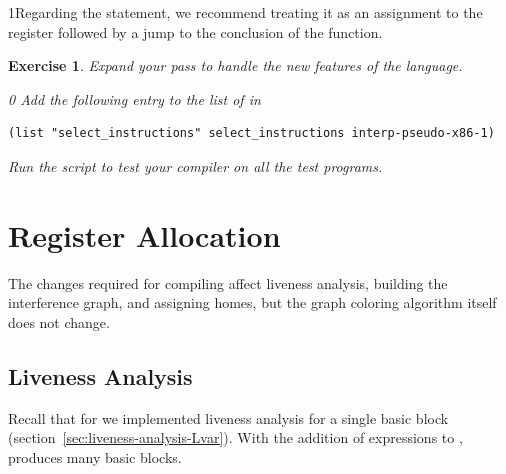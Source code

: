\documentclass[7x10]{TimesAPriori_MIT}%
\def\racketEd{0}
\def\pythonEd{1}
\def\edition{1}
\newcommand{\pythonColor}[0]{}
\newcommand{\python}[1]{{\if\edition\pythonEd\pythonColor #1\fi}}
\newtheorem{exercise}[theorem]{Exercise}
\numberwithin{theorem}{chapter}
\numberwithin{definition}{chapter}
\numberwithin{equation}{chapter}
\begin{document}
\python{Regarding the  statement, we recommend treating it
  as an assignment to the \key{rax} register followed by a jump to the
  conclusion of the \code{main} function.}

\begin{exercise}\normalfont\normalsize
Expand your  pass to handle the new
features of the \LangCIf{} language.
%
{\if\edition\racketEd
Add the following entry to the list of  in
\begin{lstlisting}
(list "select_instructions" select_instructions interp-pseudo-x86-1)
\end{lstlisting}
\fi}
%
Run the script to test your compiler on all the test programs.
\end{exercise}

\section{Register Allocation}
\label{sec:register-allocation-Lif}

The changes required for compiling \LangIf{} affect liveness analysis,
building the interference graph, and assigning homes, but the graph
coloring algorithm itself does not change.

\subsection{Liveness Analysis}
\label{sec:liveness-analysis-Lif}

Recall that for \LangVar{} we implemented liveness analysis for a
single basic block (section~\ref{sec:liveness-analysis-Lvar}).  With
the addition of  expressions to \LangIf{},
 produces many basic blocks.

\end{document}
